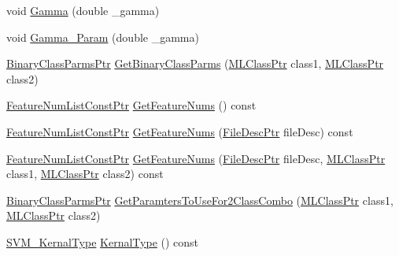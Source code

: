 \begin{DoxyCompactItemize}
\item 
void \hyperlink{class_k_k_m_l_l_1_1_s_v_mparam_a34f304809d2f576882c708be9197d659}{Gamma} (double \+\_\+gamma)
\item 
void \hyperlink{class_k_k_m_l_l_1_1_s_v_mparam_ac58b26647e9c2218acf6d09d228aa7c7}{Gamma\+\_\+\+Param} (double \+\_\+gamma)
\item 
\hyperlink{namespace_k_k_m_l_l_aca399c0744e11553270ffaca507cfee7}{Binary\+Class\+Parms\+Ptr} \hyperlink{class_k_k_m_l_l_1_1_s_v_mparam_a95ee3ea18db839fa7a05bf957b4e5294}{Get\+Binary\+Class\+Parms} (\hyperlink{namespace_k_k_m_l_l_ac272393853d59e72e8456f14cd6d8c23}{M\+L\+Class\+Ptr} class1, \hyperlink{namespace_k_k_m_l_l_ac272393853d59e72e8456f14cd6d8c23}{M\+L\+Class\+Ptr} class2)
\item 
\hyperlink{namespace_k_k_m_l_l_a81284b0a14973267260023f9a72da94a}{Feature\+Num\+List\+Const\+Ptr} \hyperlink{class_k_k_m_l_l_1_1_s_v_mparam_ab44a92bf720b8a8fea7e52f8fb7f122a}{Get\+Feature\+Nums} () const 
\item 
\hyperlink{namespace_k_k_m_l_l_a81284b0a14973267260023f9a72da94a}{Feature\+Num\+List\+Const\+Ptr} \hyperlink{class_k_k_m_l_l_1_1_s_v_mparam_a82f9d7f87a042a63aab6c2ff4a159692}{Get\+Feature\+Nums} (\hyperlink{namespace_k_k_m_l_l_aa0d0b6ab4ec18868a399b8455b05d914}{File\+Desc\+Ptr} file\+Desc) const 
\item 
\hyperlink{namespace_k_k_m_l_l_a81284b0a14973267260023f9a72da94a}{Feature\+Num\+List\+Const\+Ptr} \hyperlink{class_k_k_m_l_l_1_1_s_v_mparam_af65f1c70c6c1be8c79c64d28f82f4abd}{Get\+Feature\+Nums} (\hyperlink{namespace_k_k_m_l_l_aa0d0b6ab4ec18868a399b8455b05d914}{File\+Desc\+Ptr} file\+Desc, \hyperlink{namespace_k_k_m_l_l_ac272393853d59e72e8456f14cd6d8c23}{M\+L\+Class\+Ptr} class1, \hyperlink{namespace_k_k_m_l_l_ac272393853d59e72e8456f14cd6d8c23}{M\+L\+Class\+Ptr} class2) const 
\item 
\hyperlink{namespace_k_k_m_l_l_aca399c0744e11553270ffaca507cfee7}{Binary\+Class\+Parms\+Ptr} \hyperlink{class_k_k_m_l_l_1_1_s_v_mparam_a781fab93d6c2c65ad180c3e8f17358a9}{Get\+Paramters\+To\+Use\+For2\+Class\+Combo} (\hyperlink{namespace_k_k_m_l_l_ac272393853d59e72e8456f14cd6d8c23}{M\+L\+Class\+Ptr} class1, \hyperlink{namespace_k_k_m_l_l_ac272393853d59e72e8456f14cd6d8c23}{M\+L\+Class\+Ptr} class2)
\item 
\hyperlink{namespace_k_k_m_l_l_a14bbc982261fe6adeaf682c543ef9569}{S\+V\+M\+\_\+\+Kernal\+Type} \hyperlink{class_k_k_m_l_l_1_1_s_v_mparam_ad5f7fd716c4503f0c7dc988581afa43e}{Kernal\+Type} () const 
\item 

\end{DoxyCompactItemize}
